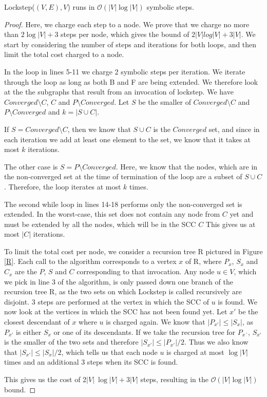 \documentclass[../master/master.tex]{subfiles}
\begin{document}
\begin{theorem}\label{lockstep} Lockstep($(V, E), V$) runs in $\mathcal{O}(|V|\log |V|)$ symbolic steps.
\end{theorem}
\begin{proof}
  Here, we charge each step to a node. We prove that we charge no more than $2 \log |V|+3$ steps per node, which gives the bound of $2|V|log|V|+3|V|$. We start by considering the number of steps and iterations for both loops, and then limit the total cost charged to a node.

  In the loop in lines 5-11 we charge 2 symbolic steps per iteration. We iterate through the loop as long as both B and F are being extended. We therefore look at the the subgraphs that result from an invocation of lockstep. We have $Converged\setminus C$, $C$ and $P\setminus Converged$. Let $S$ be the smaller of $Converged\setminus C$ and $P\setminus Converged$ and $k = |S\cup C|$.

  If $S = Converged\setminus C$, then we know that $S\cup C$ is the $Converged$ set, and since in each iteration we add at least one element to the set, we know that it takes at most $k$ iterations.

  The other case is $S=P\setminus Converged$. Here, we know that the nodes, which are in the non-converged set at the time of termination of the loop are a subset of $S\cup C$. Therefore, the loop iterates at most $k$ times.

  The second while loop in lines 14-18 performs only the non-converged set is extended. In the worst-case, this set does not contain any node from $C$ yet and must be extended by all the nodes, which will be in the SCC $C$ This gives us at most $|C|$ iterations.

  To limit the total cost per node, we consider a recursion tree R pictured in Figure \ref{R}. Each call to the algorithm corresponds to a vertex $x$ of R, where $P_x$, $S_x$ and $C_x$ are the $P$, $S$ and $C$ corresponding to that invocation. Any node $u \in V$, which we pick in line 3 of the algorithm, is only passed down one branch of the recursion tree R, as the two sets on which Lockstep is called recursively are disjoint. 3 steps are performed at the vertex in which the SCC of $u$ is found. We now look at the vertices in which the SCC has not been found yet. Let $x'$ be the closest descendant of $x$ where $u$ is charged again. We know that $|P_{x'}|\leq |S_x|$, as $P_{x'}$ is either $S_x$ or one of its descendants. If we take the recursion tree for $P_{x´}$, $S_{x'}$ is the smaller of the two sets and therefore $|S_{x'}|\leq |P_{x'}|/2$. Thus we also know that $|S_{x'}|\leq |S_{x}|/2$, which tells us that each node $u$ is charged at most $\log |V|$ times and an additional 3 steps when its SCC is found.

  This gives us the cost of $2|V|\ \log |V| + 3|V|$ steps, resulting in the $\mathcal{O}(|V|\log |V|)$ bound.
\end{proof}
\end{document}
